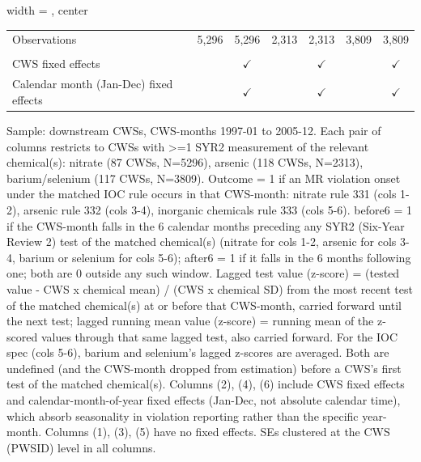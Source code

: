\begin{table}[htbp]
\begin{adjustbox}{width = \textwidth, center}
\begin{tabular}{lcccccc}
          \\
         
         Observations                           & 5,296        & 5,296         & 2,313                 & 2,313         & 3,809          & 3,809\\  
         
          \\
         
         CWS fixed effects                      &              & $\checkmark$  &                       & $\checkmark$  &                & $\checkmark$\\   
         Calendar month (Jan-Dec) fixed effects &              & $\checkmark$  &                       & $\checkmark$  &                & $\checkmark$\\   
         
         \bottomrule
         
      \end{tabular}
      
      
      
   \end{adjustbox}
      {\tiny\linespread{1}\selectfont \par \raggedright 
   Sample: downstream CWSs, CWS-months 1997-01 to 2005-12. Each pair of columns restricts to CWSs with >=1 SYR2 measurement of the relevant chemical(s): nitrate (87 CWSs, N=5296), arsenic (118 CWSs, N=2313), barium/selenium (117 CWSs, N=3809). Outcome = 1 if an MR violation onset under the matched IOC rule occurs in that CWS-month: nitrate rule 331 (cols 1-2), arsenic rule 332 (cols 3-4), inorganic chemicals rule 333 (cols 5-6). before6 = 1 if the CWS-month falls in the 6 calendar months preceding any SYR2 (Six-Year Review 2) test of the matched chemical(s) (nitrate for cols 1-2, arsenic for cols 3-4, barium or selenium for cols 5-6); after6 = 1 if it falls in the 6 months following one; both are 0 outside any such window. Lagged test value (z-score) = (tested value - CWS x chemical mean) / (CWS x chemical SD) from the most recent test of the matched chemical(s) at or before that CWS-month, carried forward until the next test; lagged running mean value (z-score) = running mean of the z-scored values through that same lagged test, also carried forward. For the IOC spec (cols 5-6), barium and selenium's lagged z-scores are averaged. Both are undefined (and the CWS-month dropped from estimation) before a CWS's first test of the matched chemical(s). Columns (2), (4), (6) include CWS fixed effects and calendar-month-of-year fixed effects (Jan-Dec, not absolute calendar time), which absorb seasonality in violation reporting rather than the specific year-month. Columns (1), (3), (5) have no fixed effects. SEs clustered at the CWS (PWSID) level in all columns.}
   
\end{table}



